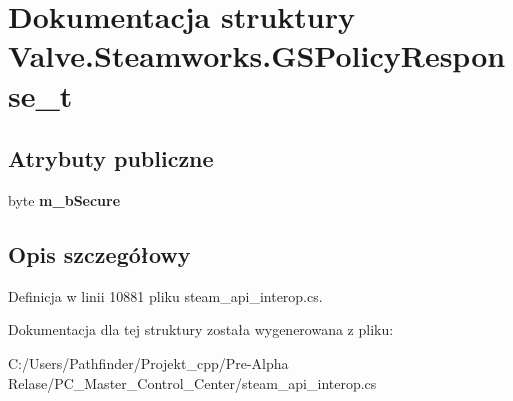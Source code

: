 \hypertarget{struct_valve_1_1_steamworks_1_1_g_s_policy_response__t}{}\section{Dokumentacja struktury Valve.\+Steamworks.\+G\+S\+Policy\+Response\+\_\+t}
\label{struct_valve_1_1_steamworks_1_1_g_s_policy_response__t}
\subsection*{Atrybuty publiczne}
\begin{DoxyCompactItemize}
\item 
\mbox{\label{struct_valve_1_1_steamworks_1_1_g_s_policy_response__t_a5c0f6aac3e1c81ee6deb98b7ba4fcaa0}} 
byte {\bfseries m\+\_\+b\+Secure}
\end{DoxyCompactItemize}


\subsection{Opis szczegółowy}


Definicja w linii 10881 pliku steam\+\_\+api\+\_\+interop.\+cs.



Dokumentacja dla tej struktury została wygenerowana z pliku\+:\begin{DoxyCompactItemize}
\item 
C\+:/\+Users/\+Pathfinder/\+Projekt\+\_\+cpp/\+Pre-\/\+Alpha Relase/\+P\+C\+\_\+\+Master\+\_\+\+Control\+\_\+\+Center/steam\+\_\+api\+\_\+interop.\+cs\end{DoxyCompactItemize}

